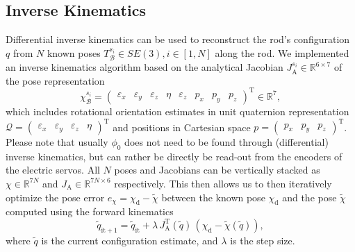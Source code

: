 \subsection{Inverse Kinematics}\label{sub:hsamodel:kinematics:inverse_kinematics}
Differential inverse kinematics can be used to reconstruct the rod's configuration $q$ from $N$ known poses $T_{\mathcal{B}}^{s_i} \in SE(3), i \in [1, N]$ along the rod. 
We implemented an inverse kinematics algorithm based on the analytical Jacobian $J_\mathrm{A}^{s_i} \in \mathbb{R}^{6 \times 7}$ of the pose representation
\begin{equation*}
    \chi_{\mathcal{B}}^{s_i} = \begin{pmatrix}
        \varepsilon_x & \varepsilon_y & \varepsilon_z & \eta & \varepsilon_z & p_x & p_y & p_z
    \end{pmatrix}^\mathrm{T} \in \mathbb{R}^{7},
\end{equation*}
which includes rotational orientation estimates in unit quaternion representation $\mathcal{Q} = \begin{pmatrix} \varepsilon_x & \varepsilon_y & \varepsilon_z & \eta \end{pmatrix}^\mathrm{T}$ and positions in Cartesian space $p = \begin{pmatrix} p_x & p_y & p_z \end{pmatrix}^\mathrm{T}$.
Please note that usually $\phi_0$ does not need to be found through (differential) inverse kinematics, but can rather be directly be read-out from the encoders of the electric servos.
All $N$ poses and Jacobians can be vertically stacked as $\chi \in \mathbb{R}^{7N}$  and $J_\mathrm{A} \in \mathbb{R}^{7N \times 6}$  respectively. This then allows us to then iteratively optimize the pose error $e_\chi = \chi_\mathrm{d} - \tilde{\chi}$ between the known pose $\chi_\mathrm{d}$ and the pose $\tilde{\chi}$ computed using the forward kinematics
\begin{equation}
    \tilde{q}_{\mathrm{it} + 1} = \tilde{q}_{\mathrm{it}} + \lambda \, J_\mathrm{A}^\mathrm{T}(\tilde{q}) \, \left ( \chi_\mathrm{d} - \tilde{\chi}(\tilde{q}) \right ),
\end{equation}
where $\tilde{q}$ is the current configuration estimate, and $\lambda$ is the step size.

